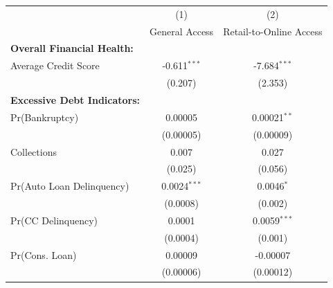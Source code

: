 \begin{tabular}{@{\extracolsep{5pt}} lcc} 
\toprule
\midrule
 & (1) & (2) \\
 & General Access  & Retail-to-Online Access  \\ 
\midrule
\textbf{Overall Financial Health:}  &  &  \\ 

 \enspace Average Credit Score 
 & -0.611$^{***}$ 
 & -7.684$^{***}$ \\ 
  & (0.207) & (2.353) \\ 
  \addlinespace

\textbf{Excessive Debt Indicators:}   & &  \\ 
   
\enspace Pr(Bankruptcy) 
 & 0.00005 
 & 0.00021$^{**}$ \\ 
  & (0.00005) & (0.00009) \\ 
  \addlinespace

\enspace Collections 
 & 0.007 
 & 0.027 \\ 
  & (0.025) & (0.056) \\ 
  \addlinespace

\enspace Pr(Auto Loan Delinquency) 
 & 0.0024$^{***}$ 
 & 0.0046$^{*}$ \\ 
  & (0.0008) & (0.002) \\ 
  \addlinespace

\enspace Pr(CC Delinquency) 
 & 0.0001 
 & 0.0059$^{***}$ \\ 
  & (0.0004) & (0.001) \\ 
  \addlinespace

\enspace Pr(Cons. Loan) 
 & 0.00009 
 & -0.00007 \\ 
  & (0.00006) & (0.00012) \\ 
\bottomrule
\end{tabular}
